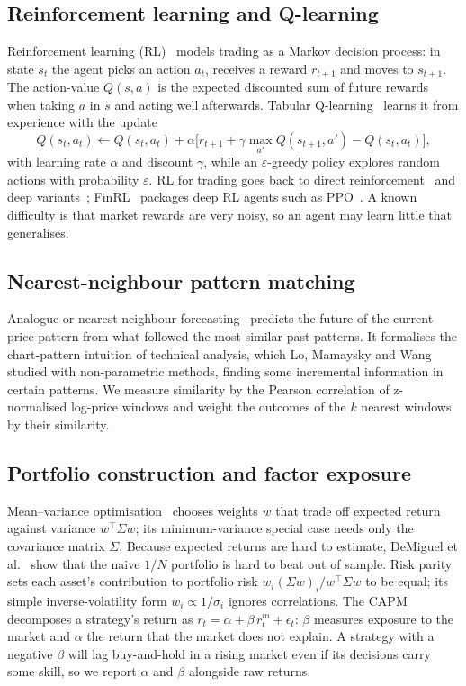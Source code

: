 \subsection{Reinforcement learning and Q-learning}
\label{sec:rl-bg}
Reinforcement learning (RL)~\cite{sutton2018rl} models trading as a Markov decision process: in state $s_t$ the agent picks an action $a_t$, receives a reward $r_{t+1}$ and moves to $s_{t+1}$. The action-value $Q(s,a)$ is the expected discounted sum of future rewards when taking $a$ in $s$ and acting well afterwards. Tabular Q-learning~\cite{watkins1992q} learns it from experience with the update
\begin{equation}
Q(s_t,a_t)\leftarrow Q(s_t,a_t)+\alpha\big[r_{t+1}+\gamma\max_{a'}Q(s_{t+1},a')-Q(s_t,a_t)\big],
\label{eq:qlearning}
\end{equation}
with learning rate $\alpha$ and discount $\gamma$, while an $\varepsilon$-greedy policy explores random actions with probability $\varepsilon$. RL for trading goes back to direct reinforcement~\cite{moody2001learning} and deep variants~\cite{deng2017deep}; FinRL~\cite{liu2020finrl} packages deep RL agents such as PPO~\cite{schulman2017ppo}. A known difficulty is that market rewards are very noisy, so an agent may learn little that generalises.

\subsection{Nearest-neighbour pattern matching}
Analogue or nearest-neighbour forecasting~\cite{cover1967nn} predicts the future of the current price pattern from what followed the most similar past patterns. It formalises the chart-pattern intuition of technical analysis, which Lo, Mamaysky and Wang~\cite{lo2000technical} studied with non-parametric methods, finding some incremental information in certain patterns. We measure similarity by the Pearson correlation of z-normalised log-price windows and weight the outcomes of the $k$ nearest windows by their similarity.

\subsection{Portfolio construction and factor exposure}
Mean--variance optimisation~\cite{markowitz1952} chooses weights $w$ that trade off expected return against variance $w^\top\Sigma w$; its minimum-variance special case needs only the covariance matrix $\Sigma$. Because expected returns are hard to estimate, DeMiguel et al.~\cite{demiguel2009naive} show that the naive $1/N$ portfolio is hard to beat out of sample. Risk parity~\cite{maillard2010erc} sets each asset's contribution to portfolio risk $w_i(\Sigma w)_i/w^\top\Sigma w$ to be equal; its simple inverse-volatility form $w_i\propto 1/\sigma_i$ ignores correlations. The CAPM~\cite{sharpe1964capm} decomposes a strategy's return as $r_t=\alpha+\beta\,r^{m}_t+\epsilon_t$: $\beta$ measures exposure to the market and $\alpha$ the return that the market does not explain. A strategy with a negative $\beta$ will lag buy-and-hold in a rising market even if its decisions carry some skill, so we report $\alpha$ and $\beta$ alongside raw returns.

